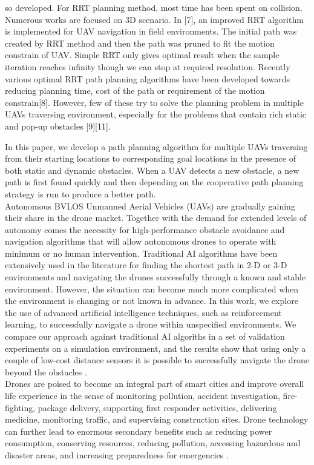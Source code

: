 \documentclass[11pt,epsf,times]{article}
\begin{document}
so developed. For RRT planning method, most time has been spent on collision. Numerous works are focused on 3D scenario. In [7], an improved RRT algorithm is implemented for UAV navigation in field environments. The initial path was created by RRT method and then the path was pruned to fit the motion constrain of UAV. Simple RRT only gives optimal result when the sample iteration reaches infinity though we can stop at required resolution. Recently various optimal RRT path planning algorithms have been developed towards reducing planning time, cost of the path or requirement of the motion constrain[8]. However, few of these try to solve the planning problem in multiple UAVs traversing environment, especially for the problems that contain rich static and pop-up obstacles [9][11].

In this paper, we develop a path planning algorithm for multiple UAVs traversing from their starting locations to corresponding goal locations in the presence of both static and dynamic obstacles. When a UAV detects a new obstacle, a new path is first found quickly and then depending on the cooperative path planning strategy is run to produce a better path. \cite{MultiPathPlanning2018}\\

Autonomous BVLOS Unmanned Aerial Vehicles (UAVs) are gradually gaining their share in the drone market. Together with the demand for extended levels of autonomy comes the necessity for high-performance obstacle avoidance and navigation algorithms that will allow autonomous drones to operate with minimum or no human intervention. Traditional AI algorithms have been extensively used in the literature for finding the shortest path in 2-D or 3-D environments and navigating the drones successfully through a known and stable environment. However, the situation can become much more complicated when the environment is changing or not known in advance. In this work, we explore the use of advanced artificial intelligence techniques, such as reinforcement learning, to successfully navigate a drone within unspecified environments. We compare our approach against traditional AI algoriths in a set of validation experiments on a simulation environment, and the results show that using only a couple of low-cost distance sensors it is possible to successfully navigate the drone beyond the obstacles \cite{Chronis2023}.\\

Drones are poised to become an integral part of smart cities and improve overall life experience in the sense of monitoring pollution, accident investigation, fire-fighting, package delivery, supporting first responder activities, delivering medicine, monitoring traffic, and supervising construction sites. Drone technology can further lead to enormous secondary benefits such as reducing power consumption, conserving resources, reducing pollution, accessing hazardous and disaster areas, and increasing preparedness for emergencies \cite{SurveyCollab2019}.\\
\end{document}
